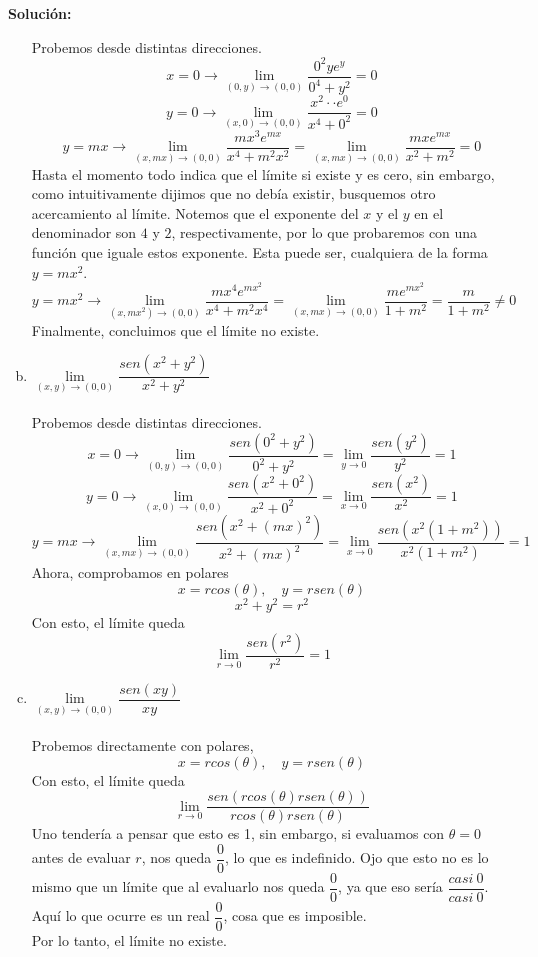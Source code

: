 \documentclass[12pt]{article}
\newenvironment{solucion}
{\begin{mdframed}[backgroundcolor=black!10]
		{\bf Solución:}\\
	}
	{
	\end{mdframed}
}
\newenvironment{preguntas}
{\begin{enumerate}\itemsep12pt
	}
	{
	\end{enumerate}
}
\newcommand{\ra}{\rightarrow}
\begin{document}
\begin{preguntas}
\begin{solucion}
\begin{enumerate}[a)]
			Probemos desde distintas direcciones.
			$$x = 0 \ra \lim\limits_{(0,y) \to (0,0)} \dfrac{0^2ye^y}{0^4+y^2} = 0$$
			$$y = 0 \ra \lim\limits_{(x,0) \to (0,0)} \dfrac{x^2\cdot \cdot e^0}{x^4+0^2} = 0$$
			$$y = mx \ra \lim\limits_{(x,mx) \to (0,0)} \dfrac{mx^3e^{mx}}{x^4+m^2x^2} = 
			\lim\limits_{(x,mx) \to (0,0)} \dfrac{mxe^{mx}}{x^2+m^2} = 0$$
			Hasta el momento todo indica que el límite si existe y es cero, sin embargo, como intuitivamente dijimos que no debía existir, busquemos otro acercamiento al límite. Notemos que el exponente del $x$ y el $y$ en el denominador son $4$ y $2$, respectivamente, por lo que probaremos con una función que iguale estos exponente. Esta puede ser, cualquiera de la forma $y = mx^2$.
			$$y = mx^2 \ra \lim\limits_{(x,mx^2) \to (0,0)} \dfrac{mx^4e^{mx^2}}{x^4+m^2x^4} = 
			\lim\limits_{(x,mx) \to (0,0)} \dfrac{me^{mx^2}}{1+m^2} = \dfrac{m}{1+m^2} \neq 0$$
			Finalmente, concluimos que el límite no existe.
\item $\lim\limits_{(x,y) \to (0,0)} \dfrac{sen(x^2+y^2)}{x^2+y^2}$\\
\\
Probemos desde distintas direcciones.
$$x = 0 \ra \lim\limits_{(0,y) \to (0,0)} \dfrac{sen(0^2+y^2)}{0^2+y^2} 
= \lim\limits_{y \to 0} \dfrac{sen(y^2)}{y^2}
= 1$$
$$y = 0 \ra \lim\limits_{(x,0) \to (0,0)} \dfrac{sen(x^2+0^2)}{x^2+0^2} 
= \lim\limits_{x \to 0} \dfrac{sen(x^2)}{x^2}
= 1$$
$$y = mx \ra \lim\limits_{(x,mx) \to (0,0)} \dfrac{sen(x^2+(mx)^2)}{x^2+(mx)^2} 
= \lim\limits_{x \to 0} \dfrac{sen(x^2(1+m^2))}{x^2(1+m^2)}
= 1$$
Ahora, comprobamos en polares
$$x = rcos(\theta), \quad y = rsen(\theta)$$
$$x^2 + y^2 = r^2$$
Con esto, el límite queda
$$\lim\limits_{r\ra 0} \dfrac{sen(r^2)}{r^2} = 1$$
\item $\lim\limits_{(x,y) \to (0,0)} \dfrac{sen(xy)}{xy}$\\
\\
Probemos directamente con polares,
$$x = rcos(\theta), \quad y = rsen(\theta)$$
Con esto, el límite queda
$$\lim\limits_{r\ra 0} \dfrac{sen(rcos(\theta) rsen(\theta))}{rcos(\theta) rsen(\theta)}$$
Uno tendería a pensar que esto es 1, sin embargo, si evaluamos con $\theta = 0$ antes de evaluar $r$, nos queda $\dfrac{0}{0}$, lo que es indefinido. Ojo que esto no es lo mismo que un límite que al evaluarlo nos queda $\dfrac{0}{0}$, ya que eso sería $\dfrac{casi\ 0}{casi\ 0}$. Aquí lo que ocurre es un real $\dfrac{0}{0}$, cosa que es imposible.\\

Por lo tanto, el límite no existe.\\


\end{enumerate}
\end{solucion}
\end{preguntas}
\end{document}
